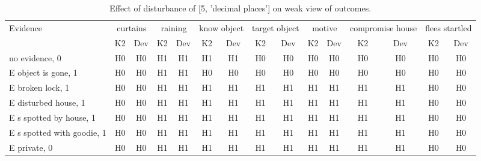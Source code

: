\begin{table}\begin{tabular}{l|cc|cc|cc|cc|cc|cc|cc}\toprule\multirow{2}{*}{Evidence} & \multicolumn{2}{c}{curtains}& \multicolumn{2}{c}{raining}& \multicolumn{2}{c}{know object}& \multicolumn{2}{c}{target object}& \multicolumn{2}{c}{motive}& \multicolumn{2}{c}{compromise house}& \multicolumn{2}{c}{flees startled}\\& {K2} & {Dev}& {K2} & {Dev}& {K2} & {Dev}& {K2} & {Dev}& {K2} & {Dev}& {K2} & {Dev}& {K2} & {Dev}\\\midrule
no evidence, 0 & H0&H0&H1&H1&H1&H1&H0&H0&H0&H0&H0&H0&H0&H0\\E object is gone, 1 & H0&H0&H1&H1&H0&H0&H0&H0&H0&H0&H0&H0&H0&H0\\E broken lock, 1 & H0&H0&H1&H1&H1&H1&H1&H1&H1&H1&H1&H1&H0&H0\\E disturbed house, 1 & H0&H0&H1&H1&H1&H1&H1&H1&H1&H1&H1&H1&H0&H0\\E s spotted by house, 1 & H0&H0&H1&H1&H1&H1&H1&H1&H1&H1&H1&H1&H0&H0\\E s spotted with goodie, 1 & H0&H0&H1&H1&H1&H1&H1&H1&H1&H1&H1&H1&H0&H0\\E private, 0 & H0&H0&H1&H1&H1&H1&H1&H1&H1&H1&H1&H1&H0&H0\\\bottomrule\end{tabular}\caption{Effect of disturbance of [5, 'decimal places'] on weak view of outcomes.}\end{table}